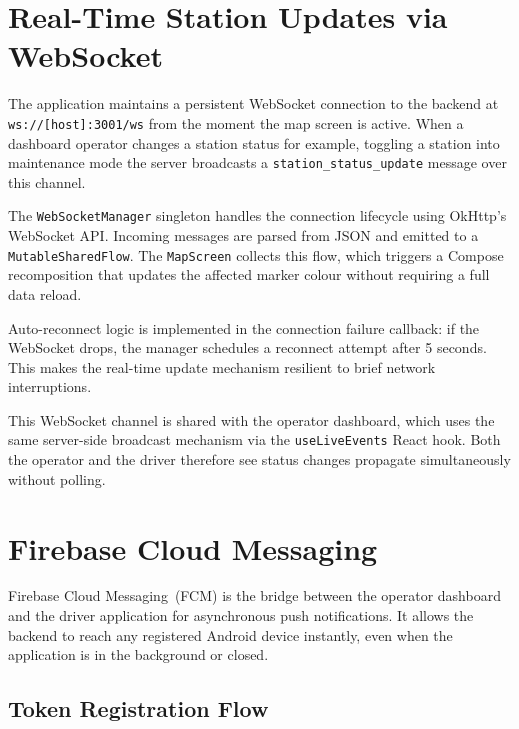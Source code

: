 \documentclass[12pt,a4paper]{report}
\begin{document}
\section{Real-Time Station Updates via WebSocket}
\label{sec:mobile-websocket}

\begin{sloppypar}
The application maintains a persistent WebSocket connection to the backend at
\texttt{ws://[host]:3001/ws} from the moment the map screen is active. When a dashboard
operator changes a station status for example, toggling a station into maintenance mode
the server broadcasts a \texttt{station\_status\_update} message over this channel.

The \texttt{WebSocketManager} singleton handles the connection lifecycle using OkHttp's
WebSocket API. Incoming messages are parsed from JSON and emitted to a
\texttt{MutableSharedFlow}. The \texttt{MapScreen} collects this flow, which triggers a Compose
recomposition that updates the affected marker colour without requiring a full data reload.

Auto-reconnect logic is implemented in the connection failure callback: if the WebSocket drops,
the manager schedules a reconnect attempt after 5 seconds. This makes the real-time update
mechanism resilient to brief network interruptions.

This WebSocket channel is shared with the operator dashboard, which uses the same server-side
broadcast mechanism via the \texttt{useLiveEvents} React hook. Both the operator and the driver
therefore see status changes propagate simultaneously without polling.
\end{sloppypar}

\section{Firebase Cloud Messaging}

Firebase Cloud Messaging~(FCM) is the bridge between the operator dashboard and the driver
application for asynchronous push notifications. It allows the backend to reach any registered
Android device instantly, even when the application is in the background or closed.

\subsection{Token Registration Flow}
\end{document}

